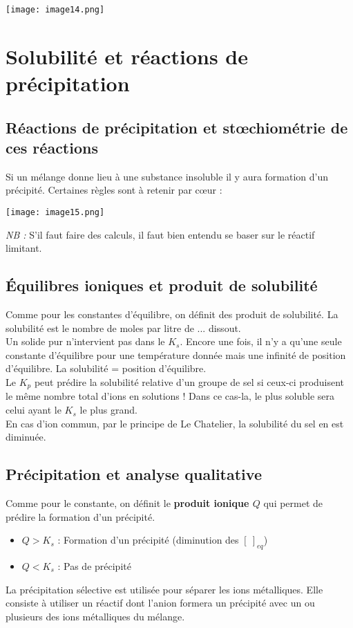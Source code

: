 \documentclass[british,french,11pt, a4paper, openany]{book}
\begin{document}
\begin{center}
	\texttt{[image: image14.png]}\\
\end{center}

\newpage
\chapter{Solubilité et réactions de précipitation}
\section{Réactions de précipitation et stœchiométrie de ces réactions}
Si un mélange donne lieu à une substance insoluble il y aura formation d'un précipité. Certaines règles sont à retenir par cœur :
\begin{center}
	\texttt{[image: image15.png]}\\
\end{center}
\textit{NB :} S'il faut faire des calculs, il faut bien entendu se baser sur le réactif limitant.

\section{Équilibres ioniques et produit de solubilité}
Comme pour les constantes d'équilibre, on définit des produit de solubilité. La solubilité est le nombre de moles par litre de ... dissout.\\
Un solide pur n'intervient pas dans le $K_s$. Encore une fois, il n'y a qu'une seule constante d'équilibre pour une température donnée mais une infinité de position d'équilibre. La solubilité = position d'équilibre. \\

Le $K_p$ peut prédire la solubilité relative d'un groupe de sel si ceux-ci produisent le même nombre total d'ions en solutions ! Dans ce cas-la, le plus soluble sera celui ayant le $K_s$ le plus grand.\\

En cas d'ion commun, par le principe de Le Chatelier, la solubilité du sel en est diminuée. 

\section{Précipitation et analyse qualitative}
Comme pour le constante, on définit le \textbf{produit ionique $Q$} qui permet de prédire la formation d'un précipité.
\begin{itemize}
	\item $Q > K_s$ : Formation d'un précipité (diminution des $[\ ]_{eq}$)
	\item $Q < K_s$ : Pas de précipité
\end{itemize}
La précipitation sélective est utilisée pour séparer les ions métalliques. Elle consiste à utiliser un réactif dont l'anion formera un précipité avec un ou plusieurs des ions métalliques du mélange. 
\end{document}
